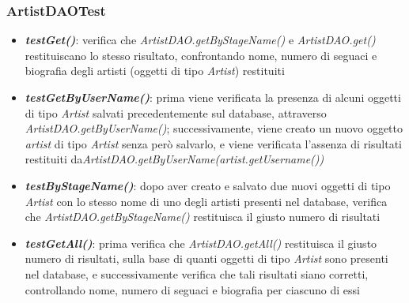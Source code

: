 \documentclass{article}
\begin{document}
  \subsubsection{ArtistDAOTest}
  \begin{itemize}

    \item \textbf{\textit{testGet()}}: verifica che \textit{ArtistDAO.getByStageName()} e \textit{ArtistDAO.get()} restituiscano lo stesso risultato, confrontando nome, numero di seguaci e biografia degli artisti (oggetti di tipo \textit{Artist}) restituiti

    \item \textbf{\textit{testGetByUserName()}}: prima viene verificata la presenza di alcuni oggetti di tipo \textit{Artist} salvati precedentemente sul database, attraverso \textit{ArtistDAO.getByUserName()}; successivamente, viene creato un nuovo oggetto \textit{artist} di tipo \textit{Artist} senza però salvarlo, e viene verificata l'assenza di risultati restituiti da\textit{ArtistDAO.getByUserName(artist.getUsername())}

    \item \textbf{\textit{testByStageName()}}: dopo aver creato e salvato due nuovi oggetti di tipo \textit{Artist} con lo stesso nome di uno degli artisti presenti nel database, verifica che \textit{ArtistDAO.getByStageName()} restituisca il giusto numero di risultati

    \item \textbf{\textit{testGetAll()}}: prima verifica che \textit{ArtistDAO.getAll()} restituisca il giusto numero di risultati, sulla base di quanti oggetti di tipo \textit{Artist} sono presenti nel database, e successivamente verifica che tali risultati siano corretti, controllando nome, numero di seguaci e biografia per ciascuno di essi

  \end{itemize}
\end{document}
